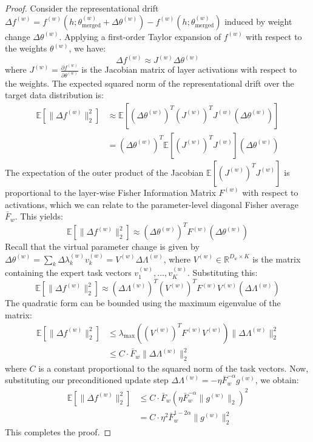\documentclass{article}
\theoremstyle{plain}
\theoremstyle{definition}
\theoremstyle{remark}
\begin{document}
\begin{proof}
Consider the representational drift $\Delta f^{(w)} = f^{(w)}(h; \theta_{\text{merged}}^{(w)} + \Delta \theta^{(w)}) - f^{(w)}(h; \theta_{\text{merged}}^{(w)})$ induced by weight change $\Delta \theta^{(w)}$. Applying a first-order Taylor expansion of $f^{(w)}$ with respect to the weights $\theta^{(w)}$, we have:
\begin{equation}
  \Delta f^{(w)} \approx J^{(w)} \Delta \theta^{(w)}
\end{equation}
where $J^{(w)} = \frac{\partial f^{(w)}}{\partial \theta^{(w)}}$ is the Jacobian matrix of layer activations with respect to the weights. The expected squared norm of the representational drift over the target data distribution is:
\begin{align}
  \mathbb{E}[\|\Delta f^{(w)}\|^2_2] &\approx \mathbb{E}[ (\Delta \theta^{(w)})^T (J^{(w)})^T J^{(w)} (\Delta \theta^{(w)}) ] \nonumber \\
  &= (\Delta \theta^{(w)})^T \mathbb{E}[(J^{(w)})^T J^{(w)}] (\Delta \theta^{(w)})
\end{align}
The expectation of the outer product of the Jacobian $\mathbb{E}[(J^{(w)})^T J^{(w)}]$ is proportional to the layer-wise Fisher Information Matrix $F^{(w)}$ with respect to activations, which we can relate to the parameter-level diagonal Fisher average $\bar{F}_w$. This yields:
\begin{equation}
  \mathbb{E}[\|\Delta f^{(w)}\|^2_2] \approx (\Delta \theta^{(w)})^T F^{(w)} (\Delta \theta^{(w)})
\end{equation}
Recall that the virtual parameter change is given by $\Delta \theta^{(w)} = \sum_k \Delta \lambda_k^{(w)} v_k^{(w)} = V^{(w)} \Delta \Lambda^{(w)}$, where $V^{(w)} \in \mathbb{R}^{D_w \times K}$ is the matrix containing the expert task vectors $v_1^{(w)}, \dots, v_K^{(w)}$. Substituting this:
\begin{equation}
  \mathbb{E}[\|\Delta f^{(w)}\|^2_2] \approx (\Delta \Lambda^{(w)})^T (V^{(w)})^T F^{(w)} V^{(w)} (\Delta \Lambda^{(w)})
\end{equation}
The quadratic form can be bounded using the maximum eigenvalue of the matrix:
\begin{align}
  \mathbb{E}[\|\Delta f^{(w)}\|^2_2] &\leq \lambda_{\max}\left( (V^{(w)})^T F^{(w)} V^{(w)} \right) \|\Delta \Lambda^{(w)}\|^2_2 \nonumber \\
  &\leq C \cdot \bar{F}_w \|\Delta \Lambda^{(w)}\|^2_2
\end{align}
where $C$ is a constant proportional to the squared norm of the task vectors. Now, substituting our preconditioned update step $\Delta \Lambda^{(w)} = -\eta \bar{F}_w^{-\alpha} g^{(w)}$, we obtain:
\begin{align}
  \mathbb{E}[\|\Delta f^{(w)}\|^2_2] &\leq C \cdot \bar{F}_w \left( \eta \bar{F}_w^{-\alpha} \|g^{(w)}\|_2 \right)^2 \nonumber \\
  &= C \cdot \eta^2 \bar{F}_w^{1 - 2\alpha} \|g^{(w)}\|^2_2
\end{align}
This completes the proof.
\end{proof}
\end{document}
